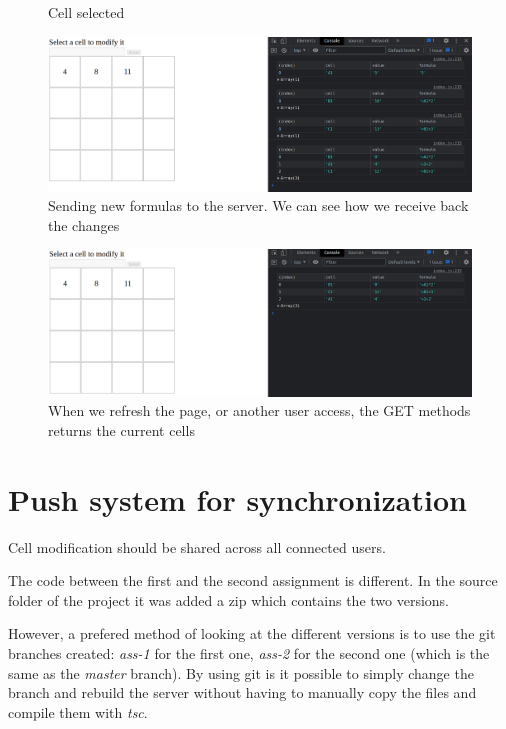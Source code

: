 \documentclass[12pt, a4paper]{article}
\begin{document}
\begin{figure}[H]
\begin{minipage}{.5\textwidth}
      \caption{Cell selected}
    \end{minipage}
  \end{figure}
  \begin{figure}[H]
    \centering
    \includegraphics[width=\columnwidth]{spreadsheet-POST.png}
    \caption{Sending new formulas to the server. We can see how we receive back the changes}
  \end{figure}
  \begin{figure}[H]
    \centering
    \includegraphics[width=\columnwidth]{spreadsheet-GET.png}
    \caption{When we refresh the page, or another user access, the GET methods returns the current cells}
  \end{figure}

  \pagebreak
  \section{Push system for synchronization}
  Cell modification should be shared across all connected users.

  The code between the first and the second assignment is different. In the source folder of the project it was added a zip which contains the two versions. 

  However, a prefered method of looking at the different versions is to use the git branches created: \textit{ass-1} for the first one, \textit{ass-2} for the second one (which is the same as the \textit{master} branch). By using git is it possible to simply change the branch and rebuild the server without having to manually copy the files and compile them with \textit{tsc}.
\end{document}
